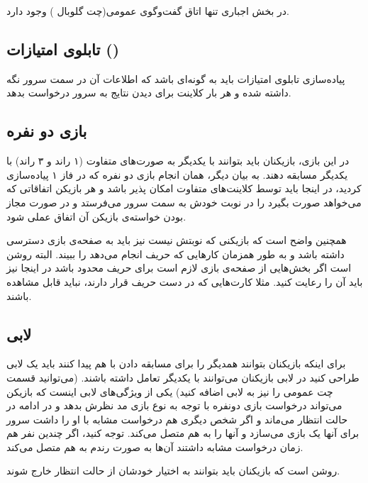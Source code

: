 \documentclass[]{article}
\begin{document}
در بخش اجباری تنها 
اتاق گفت‌وگوی عمومی(چت گلوبال )
وجود دارد.

\subsection*{{\titr تابلوی امتیازات ()}}

پیاده‌سازی تابلوی امتیازات باید به گونه‌ای باشد که اطلاعات آن در سمت سرور نگه داشته شده و هر بار کلاینت برای دیدن نتایج به سرور درخواست بدهد.

\subsection*{{\titr بازی دو نفره}}
در این بازی، بازیکنان باید بتوانند با یکدیگر به صورت‌های متفاوت (۱ راند و ۳ راند) با یکدیگر مسابقه دهند. به بیان دیگر، همان انجام بازی دو نفره که در فاز ۱ پیاده‌سازی کردید، در اینجا باید توسط کلاینت‌های متفاوت امکان پذیر باشد و هر بازیکن اتفاقاتی که می‌خواهد صورت بگیرد را در نوبت خودش به سمت سرور می‌فرستد و در صورت مجاز بودن خواسته‌ی بازیکن آن اتفاق عملی شود.

همچنین واضح است که بازیکنی که نوبتش نیست نیز باید به صفحه‌ی بازی دسترسی داشته باشد و به طور همزمان کارهایی که حریف انجام می‌دهد را ببیند. البته روشن است اگر بخش‌هایی از صفحه‌ی بازی لازم است برای حریف محدود باشد در اینجا نیز باید آن را رعایت کنید. مثلا کارت‌هایی که در دست حریف قرار دارند، نباید قابل مشاهده باشند.

\subsection*{{\titr لابی}}
برای اینکه بازیکنان بتوانند همدیگر را برای مسابقه دادن با هم پیدا کنند باید یک لابی طراحی کنید در لابی بازیکنان می‌توانند با یکدیگر تعامل داشته باشند. (می‌توانید قسمت چت عمومی را نیز به لابی اضافه کنید) یکی از ویژگی‌های لابی اینست که بازیکن می‌تواند درخواست بازی دونفره با توجه به نوع بازی مد نظرش بدهد و در ادامه در حالت انتظار می‌ماند و اگر شخص دیگری هم درخواست مشابه با او را داشت سرور برای آنها یک بازی می‌سازد و آنها را به هم متصل می‌کند. توجه کنید، اگر چندین نفر هم زمان درخواست مشابه داشتند آن‌ها به صورت رندم به هم متصل می‌کند.

روشن است که بازیکنان باید بتوانند به اختیار خودشان از حالت انتظار خارج شوند.
\end{document}
